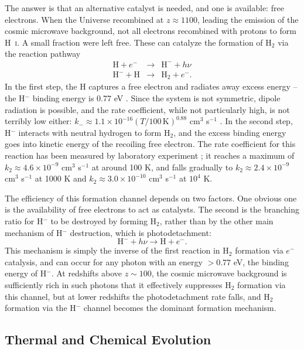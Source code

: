 The answer is that an alternative catalyst is needed, and one is available: free electrons. When the Universe recombined at $z\approx 1100$, leading the emission of the cosmic microwave background, not all electrons recombined with protons to form H~\textsc{i}. A small fraction were left free. These can catalyze the formation of H$_2$ via the reaction pathway
\begin{eqnarray}
\mathrm{H} + e^- & \rightarrow & \mathrm{H}^- + h\nu \\
\mathrm{H}^- + \mathrm{H} & \rightarrow & \mathrm{H}_2 + e^-.
\end{eqnarray}
In the first step, the H captures a free electron and radiates away excess energy -- the H$^-$ binding energy is 0.77 eV \citep{weisner64a}. Since the system is not symmetric, dipole radiation is possible, and the rate coefficient, while not particularly high, is not terribly low either: $k_{-} \approx 1.1\times 10^{-16}(T/100\,\mathrm{K})^{0.88}$ cm$^3$ s$^{-1}$ \citep{glover08a}. In the second step, H$^{-}$ interacts with neutral hydrogen to form H$_2$, and the excess binding energy goes into kinetic energy of the recoiling free electron. The rate coefficient for this reaction has been measured by laboratory experiment \citep{kreckel10a}; it reaches a maximum of $k_2 \approx 4.6\times 10^{-9}$ cm$^3$ s$^{-1}$ at around 100 K, and falls gradually to $k_2\approx 2.4\times 10^{-9}$ cm$^3$ s$^{-1}$ at 1000 K and $k_2\approx 3.0\times 10^{-10}$ cm$^3$ s$^{-1}$ at $10^4$ K.

The efficiency of this formation channel depends on two factors. One obvious one is the availability of free electrons to act as catalysts. The second is the branching ratio for H$^-$ to be destroyed by forming H$_2$, rather than by the other main mechanism of H$^-$ destruction, which is photodetachment:
\begin{equation}
\mathrm{H}^- + h\nu \rightarrow \mathrm{H} + e^{-}.
\end{equation}
This mechanism is simply the inverse of the first reaction in H$_2$ formation via $e^-$ catalysis, and can occur for any photon with an energy $>0.77$ eV, the binding energy of H$^-$. At redshifts above $z\sim 100$, the cosmic microwave background is sufficiently rich in such photons that it effectively suppresses H$_2$ formation via this channel, but at lower redshifts the photodetachment rate falls, and H$_2$ formation via the H$^-$ channel becomes the dominant formation mechanism.

\subsection{Thermal and Chemical Evolution}

